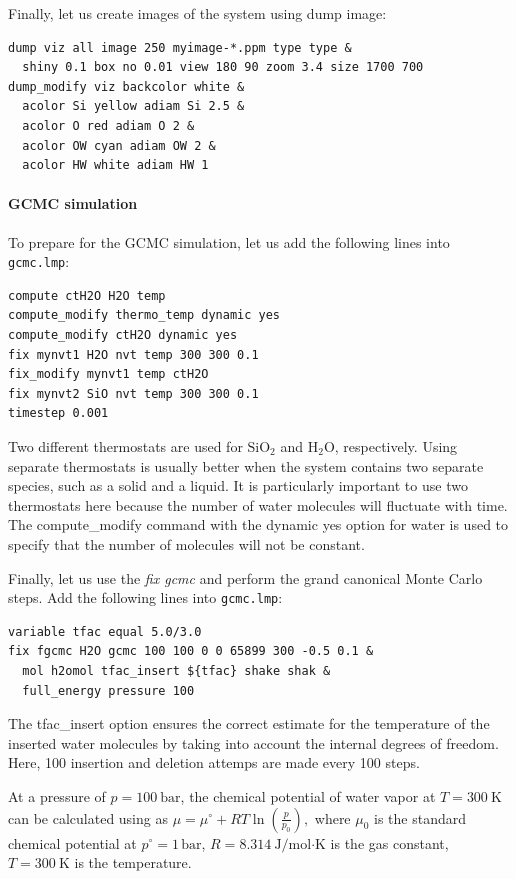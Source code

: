 \documentclass[9pt,tutorial]{livecoms}
\newcommand{\lmpcmd}[1]{\hspace{0pt}\colorbox{listing}{\textcolor{command}{\small{#1}}}\hspace{0pt}} %
\newcommand{\flecmd}[1]{\textcolor{command}{\texttt{#1}}} %
\begin{document}
Finally, let us create images
of the system using \lmpcmd{dump image}:
\begin{lstlisting}
dump viz all image 250 myimage-*.ppm type type &
  shiny 0.1 box no 0.01 view 180 90 zoom 3.4 size 1700 700
dump_modify viz backcolor white &
  acolor Si yellow adiam Si 2.5 &
  acolor O red adiam O 2 &
  acolor OW cyan adiam OW 2 &
  acolor HW white adiam HW 1
\end{lstlisting}

\paragraph{GCMC simulation}

To prepare for the GCMC simulation, let us add the
following lines into \flecmd{gcmc.lmp}:
\begin{lstlisting}
compute ctH2O H2O temp
compute_modify thermo_temp dynamic yes
compute_modify ctH2O dynamic yes
fix mynvt1 H2O nvt temp 300 300 0.1
fix_modify mynvt1 temp ctH2O
fix mynvt2 SiO nvt temp 300 300 0.1
timestep 0.001
\end{lstlisting}
Two different thermostats are used for $\text{SiO}_2$ and $\text{H}_2\text{O}$,
respectively.  Using separate thermostats is usually better when the system contains
two separate species, such as a solid and a liquid.  It is particularly important
to use two thermostats here because the number of water molecules will fluctuate
with time.  The \lmpcmd{compute\_modify} command with the \lmpcmd{dynamic yes}
option for water is used to specify that the number of molecules will not be constant.

Finally, let us use the \textit{fix gcmc} and perform the grand canonical Monte
Carlo steps.  Add the following lines into \flecmd{gcmc.lmp}:
\begin{lstlisting}
variable tfac equal 5.0/3.0
fix fgcmc H2O gcmc 100 100 0 0 65899 300 -0.5 0.1 &
  mol h2omol tfac_insert ${tfac} shake shak &
  full_energy pressure 100
\end{lstlisting}
The \lmpcmd{tfac\_insert} option ensures the correct estimate for the temperature
of the inserted water molecules by taking into account the internal degrees of
freedom.  Here, 100 insertion and deletion attemps are made every 100 steps.

\begin{note}
At a pressure of $p = 100\ \text{bar}$, the chemical potential of water
vapor at $T = 300\ \text{K}$ can be calculated using as
$\mu = \mu^\circ + RT \ln (\frac{p}{p_0}),$
where $\mu_0$ is the standard chemical potential
at $p^\circ = 1 \, \text{bar}$, \(R = 8.314\ \text{J/mol·K}\) is
the gas constant, \(T = 300\ \text{K}\) is the temperature.
\end{note}
\end{document}
